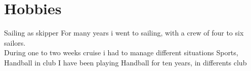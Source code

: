 \documentclass{friggeri-cv}
\begin{document}
\section{Hobbies}
\begin{entrylist}
	\entry  {} {Sailing as skipper} {}
	{
		For many years i went to sailing, with a crew of four to six sailors. \\
		During one to two weeks cruise i had to manage different situations
	}
	\entry  {} {Sports, Handball in club} {} {I have been playing Handball for ten years, in differents club}
\end{entrylist}
\end{document}
